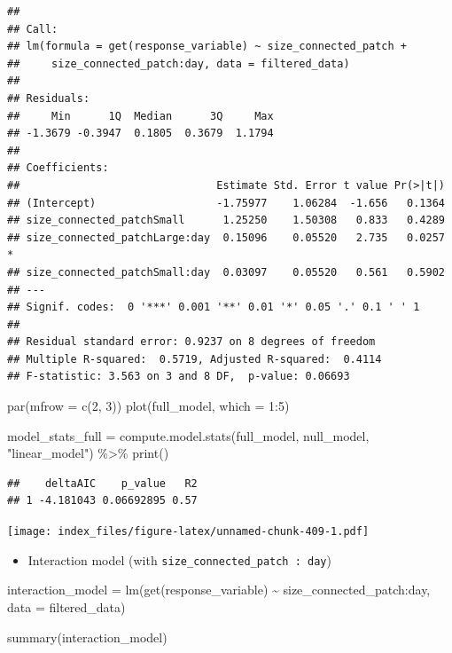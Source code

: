 \documentclass[
]{article}
\newenvironment{Shaded}{\begin{snugshade}}{\end{snugshade}}
\newcommand{\AttributeTok}[1]{\textcolor[rgb]{0.77,0.63,0.00}{#1}}
\newcommand{\DecValTok}[1]{\textcolor[rgb]{0.00,0.00,0.81}{#1}}
\newcommand{\FunctionTok}[1]{\textcolor[rgb]{0.00,0.00,0.00}{#1}}
\newcommand{\NormalTok}[1]{#1}
\newcommand{\OtherTok}[1]{\textcolor[rgb]{0.56,0.35,0.01}{#1}}
\newcommand{\SpecialCharTok}[1]{\textcolor[rgb]{0.00,0.00,0.00}{#1}}
\newcommand{\StringTok}[1]{\textcolor[rgb]{0.31,0.60,0.02}{#1}}
\providecommand{\tightlist}{%
  \setlength{\itemsep}{0pt}\setlength{\parskip}{0pt}}
\begin{document}
\begin{verbatim}
## 
## Call:
## lm(formula = get(response_variable) ~ size_connected_patch + 
##     size_connected_patch:day, data = filtered_data)
## 
## Residuals:
##     Min      1Q  Median      3Q     Max 
## -1.3679 -0.3947  0.1805  0.3679  1.1794 
## 
## Coefficients:
##                               Estimate Std. Error t value Pr(>|t|)  
## (Intercept)                   -1.75977    1.06284  -1.656   0.1364  
## size_connected_patchSmall      1.25250    1.50308   0.833   0.4289  
## size_connected_patchLarge:day  0.15096    0.05520   2.735   0.0257 *
## size_connected_patchSmall:day  0.03097    0.05520   0.561   0.5902  
## ---
## Signif. codes:  0 '***' 0.001 '**' 0.01 '*' 0.05 '.' 0.1 ' ' 1
## 
## Residual standard error: 0.9237 on 8 degrees of freedom
## Multiple R-squared:  0.5719, Adjusted R-squared:  0.4114 
## F-statistic: 3.563 on 3 and 8 DF,  p-value: 0.06693
\end{verbatim}

\begin{Shaded}
\begin{Highlighting}[]
\FunctionTok{par}\NormalTok{(}\AttributeTok{mfrow =} \FunctionTok{c}\NormalTok{(}\DecValTok{2}\NormalTok{, }\DecValTok{3}\NormalTok{))}
\FunctionTok{plot}\NormalTok{(full\_model, }\AttributeTok{which =} \DecValTok{1}\SpecialCharTok{:}\DecValTok{5}\NormalTok{)}

\NormalTok{model\_stats\_full }\OtherTok{=} \FunctionTok{compute.model.stats}\NormalTok{(full\_model,}
\NormalTok{                                       null\_model,}
                                       \StringTok{"linear\_model"}\NormalTok{) }\SpecialCharTok{\%\textgreater{}\%}
  \FunctionTok{print}\NormalTok{()}
\end{Highlighting}
\end{Shaded}

\begin{verbatim}
##    deltaAIC    p_value   R2
## 1 -4.181043 0.06692895 0.57
\end{verbatim}

\texttt{[image: index\_files/figure-latex/unnamed-chunk-409-1.pdf]}

\begin{itemize}
\tightlist
\item
  Interaction model (with \texttt{size\_connected\_patch\ :\ day})
\end{itemize}

\begin{Shaded}
\begin{Highlighting}[]
\NormalTok{interaction\_model }\OtherTok{=} \FunctionTok{lm}\NormalTok{(}\FunctionTok{get}\NormalTok{(response\_variable) }\SpecialCharTok{\textasciitilde{}}
\NormalTok{                         size\_connected\_patch}\SpecialCharTok{:}\NormalTok{day,}
                       \AttributeTok{data =}\NormalTok{ filtered\_data)}

\FunctionTok{summary}\NormalTok{(interaction\_model)}
\end{Highlighting}
\end{Shaded}
\end{document}
